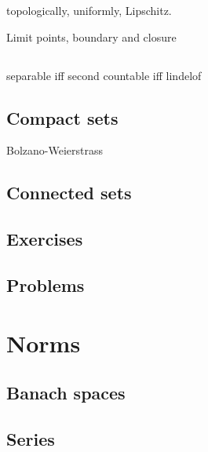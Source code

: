 \documentclass{../../large}
\begin{document}
\begin{prb}
topologically, uniformly, Lipschitz.
\end{prb}


\begin{prb}
Limit points,
boundary and closure
\end{prb}


\section{}
\begin{prb}
\end{prb}
\begin{prb}
separable iff second countable iff lindelof
\end{prb}


\section{Compact sets}
Bolzano-Weierstrass

\section{Connected sets}



\section*{Exercises}
\section*{Problems}





\chapter{Norms}


\section{Banach spaces}

\begin{prb}
\end{prb}


\section{Series}
\end{document}
